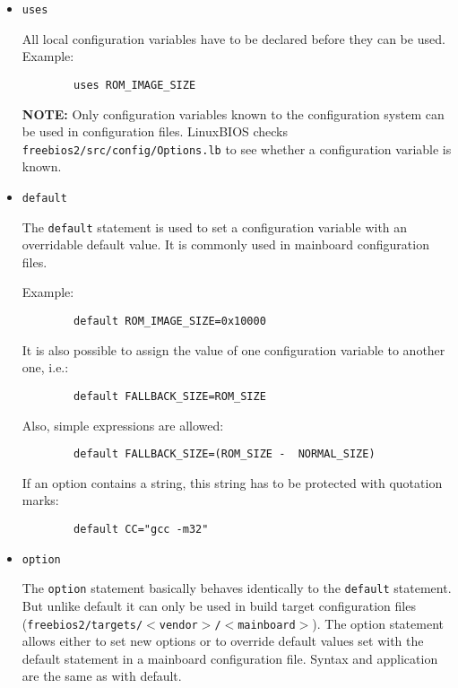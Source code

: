 \documentclass[titlepage,12pt]{article}
\begin{document}
\begin{itemize}

\item \begin{verbatim}uses\end{verbatim}

All local configuration variables have to be declared before they can be
used. Example:
\begin{verbatim}
        uses ROM_IMAGE_SIZE
\end{verbatim}

\textbf{NOTE:} Only configuration variables known to the configuration
system can be used in configuration files. LinuxBIOS checks 
\texttt{freebios2/src/config/Options.lb} to see whether a configuration
variable is known.

\item \begin{verbatim}default\end{verbatim}

The \texttt{default} statement is used to set a configuration variable
with an overridable default value. It is commonly used in mainboard
configuration files.  

Example:

\begin{verbatim}
        default ROM_IMAGE_SIZE=0x10000
\end{verbatim}

It is also possible to assign the value of one configuration variable to
another one, i.e.:

\begin{verbatim}
        default FALLBACK_SIZE=ROM_SIZE
\end{verbatim}

Also, simple expressions are allowed:

\begin{verbatim}
        default FALLBACK_SIZE=(ROM_SIZE -  NORMAL_SIZE)
\end{verbatim}

If an option contains a string, this string has to be protected with
quotation marks: 

\begin{verbatim}
        default CC="gcc -m32"
\end{verbatim}

\item \begin{verbatim}option\end{verbatim}

The \texttt{option} statement basically behaves identically to the
\texttt{default} statement. But unlike default it can only be used in
build target configuration files
(\texttt{freebios2/targets/$<$vendor$>$/$<$mainboard$>$}). The option
statement allows either to set new options or to override default values
set with the default statement in a mainboard configuration file.
Syntax and application are the same as with default.

\end{itemize}
\end{document}
